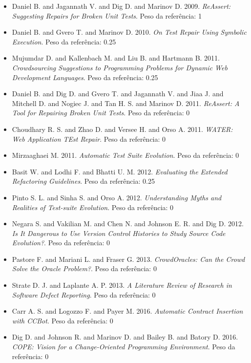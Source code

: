 \begin{itemize}
\item Daniel B. and Jagannath V. and Dig D. and Marinov D.
      2009.
      {\it ReAssert: Suggesting Repairs for Broken Unit Tests}.
      Peso da referência: 1
\item Daniel B. and Gvero T. and Marinov D.
      2010.
      {\it On Test Repair Using Symbolic Execution}.
      Peso da referência: 0.25
\item Mujumdar D. and Kallenbach M. and Liu B. and Hartmann B.
      2011.
      {\it Crowdsourcing Suggestions to Programming Problems for Dynamic Web Development Languages}.
      Peso da referência: 0.25
\item Daniel B. and Dig D. and Gvero T. and Jagannath V. and Jiaa J. and Mitchell D. and Nogiec J. and Tan H. S. and Marinov D.
      2011.
      {\it ReAssert: A Tool for Repairing Broken Unit Tests}.
      Peso da referência: 0
\item Choudhary R. S. and Zhao D. and Versee H. and Orso A.
      2011.
      {\it WATER: Web Application TEst Repair}.
      Peso da referência: 0
\item Mirzaaghaei M.
      2011.
      {\it Automatic Test Suite Evolution}.
      Peso da referência: 0
\item Basit W. and Lodhi F. and Bhatti U. M.
      2012.
      {\it Evaluating the Extended Refactoring Guidelines}.
      Peso da referência: 0.25
\item Pinto S. L. and Sinha S. and Orso A.
      2012.
      {\it Understanding Myths and Realities of Test-suite Evolution}.
      Peso da referência: 0
\item Negara S. and Vakilian M. and Chen N. and Johnson E. R. and Dig D.
      2012.
      {\it Is It Dangerous to Use Version Control Histories to Study Source Code Evolution?}.
      Peso da referência: 0
\item Pastore F. and Mariani L. and Fraser G.
      2013.
      {\it CrowdOracles: Can the Crowd Solve the Oracle Problem?}.
      Peso da referência: 0
\item Strate D. J. and Laplante A. P.
      2013.
      {\it A Literature Review of Research in Software Defect Reporting}.
      Peso da referência: 0
\item Carr A. S. and Logozzo F. and Payer M.
      2016.
      {\it Automatic Contract Insertion with CCBot}.
      Peso da referência: 0
\item Dig D. and Johnson R. and Marinov D. and Bailey B. and Batory D.
      2016.
      {\it COPE: Vision for a Change-Oriented Programming Environment}.
      Peso da referência: 0
\end{itemize}

